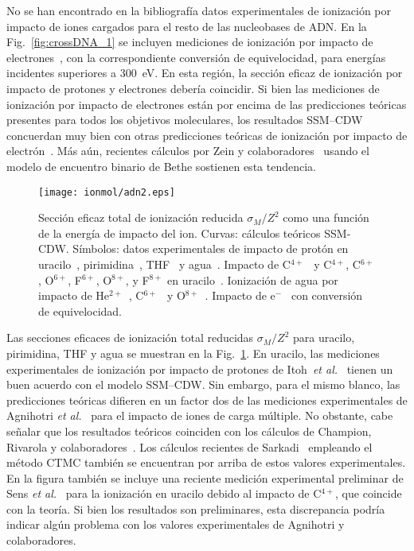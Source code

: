 No se han encontrado en la bibliografía datos experimentales de 
ionización por impacto de iones cargados para el resto de las 
nucleobases de ADN. En la Fig.~\ref{fig:crossDNA_1} se incluyen 
mediciones de ionización por impacto de electrones~\cite{Rahman:16}, con 
la correspondiente conversión de equivelocidad, para energías incidentes 
superiores a 300~eV. En esta región, la sección eficaz de ionización por 
impacto de protones y electrones debería coincidir. Si bien las 
mediciones de ionización por impacto de electrones están por encima de 
las predicciones teóricas presentes para todos los objetivos 
moleculares, los resultados SSM--CDW concuerdan muy bien con otras 
predicciones teóricas de ionización por impacto de 
electrón~\cite{mozejko2003,tan2018}. Más aún, recientes cálculos por 
Zein y colaboradores~\cite{Zein:21} usando el modelo de encuentro 
binario de Bethe sostienen esta tendencia.

\begin{figure}
\centering
\texttt{[image: ionmol/adn2.eps]}
\caption[Sección eficaz total de ionización reducida por $Z$ 
(Parte II).]
{Sección eficaz total de ionización reducida $\sigma_{M}/Z^2$ como 
una función de la energía de impacto del ion. 
Curvas: cálculos teóricos SSM-CDW. 
Símbolos: datos experimentales de impacto de protón en 
uracilo~\cite{itoh2013}, 
pirimidina~\cite{wolff2014}, THF~\cite{wang2016} y agua~\cite{Luna2007,
Bolorizadeh86,H_Rudd85,toburen80}. Impacto de C$^{4+}$~\cite{Sens:20} y 
C$^{4+}$, C$^{6+}$, O$^{6+}$, F$^{6+}$, O$^{8+}$, y F$^{8+}$ en 
uracilo~\cite{agnihotri2012,agnihotri2013}. Ionización de agua por 
impacto de He$^{2+}$~\cite{Ohsawa05,He_Rudd85,toburen80}, 
C$^{6+}$~\cite{DalCappello:09,Bhattacharjee:17} y 
O$^{8+}$~\cite{Bhattacharjee:16}. 
Impacto de e$^-$~\cite{bug2017,wolf2019,fuss2009} con conversión de 
equivelocidad.}
\label{fig:crossDNA_2}
\end{figure} 

Las secciones eficaces de ionización total reducidas $\sigma_M/Z^2$ 
para uracilo, pirimidina, THF y agua se muestran en la 
Fig.~\ref{fig:crossDNA_2}. En uracilo, las mediciones experimentales de 
ionización por impacto de protones de 
Itoh~\textit{et al.}~\cite{itoh2013} tienen un buen acuerdo con el 
modelo SSM--CDW. Sin embargo, para el mismo blanco, las predicciones 
teóricas difieren en un factor dos de las mediciones experimentales de 
Agnihotri \textit{et al.}~\cite{agnihotri2012,agnihotri2013} para el 
impacto de iones de carga múltiple. No obstante, cabe señalar que los 
resultados teóricos coinciden con los cálculos de Champion, 
Rivarola y colaboradores~\cite{agnihotri2012,champion2012}. Los cálculos 
recientes de Sarkadi~\cite{sarkadi2016} empleando el método CTMC también 
se encuentran por arriba de estos valores experimentales. En la figura 
también se incluye una reciente medición experimental preliminar de Sens 
\textit{et al.}~\cite{Sens:20} para la ionización en uracilo debido al 
impacto de C$^{4+}$, que coincide con la teoría. Si bien los resultados 
son preliminares, esta discrepancia podría indicar algún problema con 
los valores experimentales de Agnihotri y colaboradores. 

